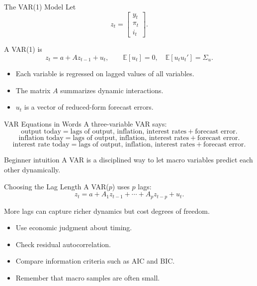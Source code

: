 \documentclass[11pt,aspectratio=169]{beamer}
\newcommand{\E}{\mathbb{E}}
\newcommand{\AIC}{\mathrm{AIC}}
\newcommand{\BIC}{\mathrm{BIC}}
\newcommand{\derivbutton}[1]{\vspace{0.4em}\hfill\hyperlink{app:#1}{\beamerbutton{Appendix details}}}
\begin{document}
\begin{frame}{The VAR(1) Model}
  \hypertarget{main:var1}{}
  Let
  \[
    z_t=
    \begin{bmatrix}
      y_t\\
      \pi_t\\
      i_t
    \end{bmatrix}.
  \]

  A VAR(1) is
  \[
    z_t=a+A z_{t-1}+u_t,
    \qquad
    \E[u_t]=0,\quad
    \E[u_tu_t']=\Sigma_u.
  \]

  \begin{itemize}
    \item Each variable is regressed on lagged values of all variables.
    \item The matrix \(A\) summarizes dynamic interactions.
    \item \(u_t\) is a vector of reduced-form forecast errors.
  \end{itemize}
  \derivbutton{var-companion}
\end{frame}

\begin{frame}{VAR Equations in Words}
  A three-variable VAR says:
  \[
    \text{output today}
    =
    \text{lags of output, inflation, interest rates}
    +
    \text{forecast error}.
  \]
  \[
    \text{inflation today}
    =
    \text{lags of output, inflation, interest rates}
    +
    \text{forecast error}.
  \]
  \[
    \text{interest rate today}
    =
    \text{lags of output, inflation, interest rates}
    +
    \text{forecast error}.
  \]

  \begin{block}{Beginner intuition}
    A VAR is a disciplined way to let macro variables predict each other dynamically.
  \end{block}
\end{frame}

\begin{frame}{Choosing the Lag Length}
  A VAR(\(p\)) uses \(p\) lags:
  \[
    z_t=a+A_1z_{t-1}+\cdots+A_pz_{t-p}+u_t.
  \]

  More lags can capture richer dynamics but cost degrees of freedom.

  \begin{itemize}
    \item Use economic judgment about timing.
    \item Check residual autocorrelation.
    \item Compare information criteria such as \(\AIC\) and \(\BIC\).
    \item Remember that macro samples are often small.
  \end{itemize}
\end{frame}
\end{document}
